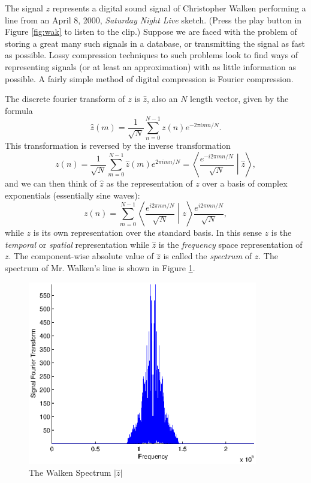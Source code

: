 \documentclass{report}
\begin{document}
The signal $z$ represents a digital sound signal of Christopher Walken performing a line from an April 8, 2000, \emph{Saturday Night Live} sketch. (Press the play button in Figure \ref{fig:wak} to listen to the clip.) Suppose we are faced with the problem of storing a great many such signals in a database, or transmitting the signal as fast as possible. Lossy compression techniques to such problems look to find ways of representing signals (or at least an approximation) with as little information as possible. A fairly simple method of digital compression is Fourier compression.

The discrete fourier transform of $z$ is $\hat z$, also an $N$ length vector, given by the formula
\begin{equation}
\label{equation:Fourier}
\hat z (m) = \frac{1}{\sqrt{N}}\sum^{N-1}_{n=0} z(n) e^{-2\pi i m n/N}.
\end{equation}
This transformation is reversed by the inverse transformation
\begin{equation}
\label{equation:Finverse}
z (n) = \frac{1}{\sqrt{N}}\sum^{N-1}_{m=0} \hat z(m) e^{2\pi i m n/N}=\left \langle \frac{e^{-i2\pi mn/N}}{\sqrt N} \middle | \hat z \right \rangle,
\end{equation}
and we can then think of $\hat z$ as the representation of $z$ over a basis of complex exponentials (essentially sine waves):
$$
z(n)= \sum^{N-1}_{m=0} \left \langle \frac{e^{i2\pi mn/N}}{\sqrt N} \middle | z \right \rangle \frac{e^{i2\pi mn/N}}{\sqrt N},
$$
while $z$ is its own representation over the standard basis. In this sense $z$ is the \emph{temporal} or \emph{spatial} representation while $\hat z$ is the \emph{frequency} space representation of $z$. The component-wise absolute value of $\hat z$ is called the \emph{spectrum} of $z$. The spectrum of Mr. Walken's line is shown in Figure \ref{fig:Fwak}. 

\begin{figure}
\center
\caption{The Walken Spectrum $|\hat z|$}
\label{fig:Fwak}
\includegraphics[height=8cm]{Fourier.eps}
\end{figure}
\end{document}

